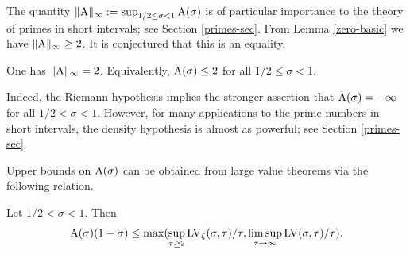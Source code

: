 The quantity $\|\mathrm{A}\|_\infty := \sup_{1/2 \leq \sigma < 1} \mathrm{A}(\sigma)$ is of particular importance to the theory of primes in short intervals; see Section \ref{primes-sec}.  From Lemma \ref{zero-basic} we have $\|\mathrm{A}\|_\infty \geq 2$.  It is conjectured that this is an equality.

\begin{conjecture}\label{density-hypothesis}  One has $\|\mathrm{A}\|_\infty=2$.  Equivalently, $\mathrm{A}(\sigma) \leq 2$ for all $1/2 \leq \sigma < 1$.
\end{conjecture}

Indeed, the Riemann hypothesis implies the stronger assertion that $\mathrm{A}(\sigma) = -\infty$ for all $1/2 < \sigma < 1$.  However, for many applications to the prime numbers in short intervals, the density hypothesis is almost as powerful; see Section \ref{primes-sec}.

Upper bounds on $\mathrm{A}(\sigma)$ can be obtained from large value theorems via the following relation.

\begin{lemma}\label{zero-from-large}  Let $1/2 < \sigma < 1$.  Then
$$ \mathrm{A}(\sigma)(1-\sigma) \leq \max( \sup_{\tau \geq 2} \mathrm{LV}_\zeta(\sigma,\tau)/\tau, \limsup_{\tau \to \infty} \mathrm{LV}(\sigma,\tau)/\tau ).$$
\end{lemma}

